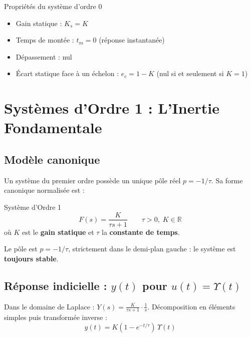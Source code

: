 \documentclass[11pt,a4paper]{report}
\begin{document}
\begin{importantbox}{Propriétés du système d'ordre 0}
  \begin{itemize}
    \item Gain statique : $K_s = K$
    \item Temps de montée : $t_m = 0$ (réponse instantanée)
    \item Dépassement : nul
    \item Écart statique face à un échelon : $e_c = 1 - K$ (nul si et seulement si $K = 1$)
  \end{itemize}
\end{importantbox}

\section{Systèmes d'Ordre 1 : L'Inertie Fondamentale}

\subsection{Modèle canonique}

Un système du premier ordre possède un unique pôle réel $p = -1/\tau$. Sa forme canonique normalisée est :

\begin{defbox}{Système d'Ordre 1}
\[
  F(s) = \frac{K}{\tau s + 1} \qquad \tau > 0,\; K \in \mathbb{R}
\]
où $K$ est le \textbf{gain statique} et $\tau$ la \textbf{constante de temps}.
\end{defbox}

Le pôle est $p = -1/\tau$, strictement dans le demi-plan gauche : le système est \textbf{toujours stable}.

\subsection{Réponse indicielle : $y(t)$ pour $u(t) = \Upsilon(t)$}

Dans le domaine de Laplace : $Y(s) = \frac{K}{\tau s + 1} \cdot \frac{1}{s}$. Décomposition en éléments simples puis transformée inverse :
\[
  y(t) = K\left(1 - e^{-t/\tau}\right)\,\Upsilon(t)
\]
\end{document}
